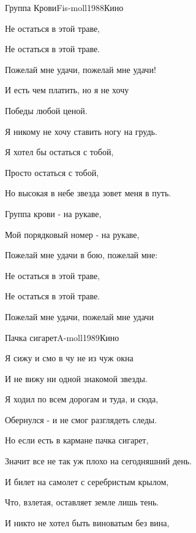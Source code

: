 \documentclass[a4paper,draft]{book}
\begin{document}
\begin{otherlanguage}{russian}
\begin{song}{Группа Крови}{Fis-moll}{1988}{Кино}{}{}
\begin{SBChorus}
	Не остаться в этой траве,

	Не остаться в этой траве.

	Пожелай мне удачи, пожелай мне удачи!
\end{SBChorus}

\begin{SBVerse}
	И есть чем платить, но я не хочу

	Победы любой ценой.

	Я никому не хочу ставить ногу на грудь.

	Я хотел бы остаться с тобой,

	Просто остаться с тобой,

	Но высокая в небе звезда зовет меня в путь.
\end{SBVerse}

\begin{SBChorus}
	Группа крови - на рукаве,

	Мой порядковый номер - на рукаве,

	Пожелай мне удачи в бою, пожелай мне:

	Не остаться в этой траве,

	Не остаться в этой траве.

	Пожелай мне удачи, пожелай мне удачи
\end{SBChorus}
\end{song}

\begin{song}{Пачка сигарет}{A-moll}{1989}{Кино}{}{}

\begin{SBVerse}
	Я сижу и смо в чу не из чуж окна
	
	И не вижу ни одной знакомой звезды.
	
	Я ходил по всем дорогам и туда, и сюда,
	
	Обернулся - и не смог разглядеть следы.
\end{SBVerse}

\begin{SBChorus}
	Но если есть в кармане пачка сигарет,

	Значит все не так уж плохо на сегодняшний день.

	И билет на самолет с серебристым крылом,

	Что, взлетая, оставляет земле лишь тень.
\end{SBChorus}

\begin{SBVerse}
	И никто не хотел быть виноватым без вина,
	

\end{SBVerse}
\end{song}
\end{otherlanguage}
\end{document}
